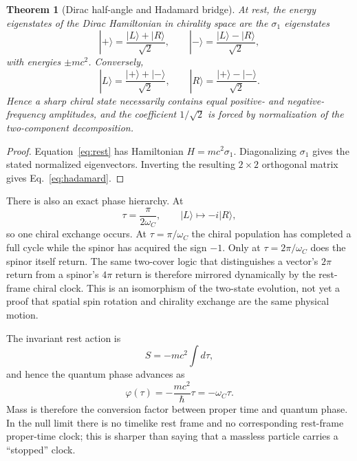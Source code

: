 \documentclass[11pt]{article}
\newtheorem{theorem}{Theorem}[section]
\theoremstyle{definition}\newtheorem{definition}[theorem]{Definition}
\theoremstyle{remark}\newtheorem{remark}[theorem]{Remark}\newtheorem{conjecture}[theorem]{Conjecture}
\begin{document}
\begin{theorem}[Dirac half-angle and Hadamard bridge]\label{thm:hadamard}
At rest, the energy eigenstates of the Dirac Hamiltonian in chirality space are the $\sigma_1$ eigenstates
\begin{equation}
 |+\rangle=\frac{|L\rangle+|R\rangle}{\sqrt2},\qquad
 |-\rangle=\frac{|L\rangle-|R\rangle}{\sqrt2},
\end{equation}
with energies $\pm mc^2$. Conversely,
\begin{equation}\label{eq:hadamard}
 |L\rangle=\frac{|+\rangle+|-\rangle}{\sqrt2},\qquad
 |R\rangle=\frac{|+\rangle-|-\rangle}{\sqrt2}.
\end{equation}
Hence a sharp chiral state necessarily contains equal positive- and negative-frequency amplitudes, and the coefficient $1/\sqrt2$ is forced by normalization of the two-component decomposition.
\end{theorem}
\begin{proof}
Equation~\eqref{eq:rest} has Hamiltonian $H=mc^2\sigma_1$. Diagonalizing $\sigma_1$ gives the stated normalized eigenvectors. Inverting the resulting $2\times2$ orthogonal matrix gives Eq.~\eqref{eq:hadamard}.
\end{proof}

There is also an exact phase hierarchy. At
\begin{equation}
 \tau=\frac{\pi}{2\omega_C},\qquad |L\rangle\mapsto-i|R\rangle,
\end{equation}
so one chiral exchange occurs. At $\tau=\pi/\omega_C$ the chiral population has completed a full cycle while the spinor has acquired the sign $-1$. Only at $\tau=2\pi/\omega_C$ does the spinor itself return. The same two-cover logic that distinguishes a vector's $2\pi$ return from a spinor's $4\pi$ return is therefore mirrored dynamically by the rest-frame chiral clock. This is an isomorphism of the two-state evolution, not yet a proof that spatial spin rotation and chirality exchange are the same physical motion.

The invariant rest action is
\begin{equation}
 S=-mc^2\int d\tau,
\end{equation}
and hence the quantum phase advances as
\begin{equation}\label{eq:propertime}
 \varphi(\tau)=-\frac{mc^2}{\hbar}\tau=-\omega_C\tau.
\end{equation}
Mass is therefore the conversion factor between proper time and quantum phase. In the null limit there is no timelike rest frame and no corresponding rest-frame proper-time clock; this is sharper than saying that a massless particle carries a ``stopped'' clock.
\end{document}
